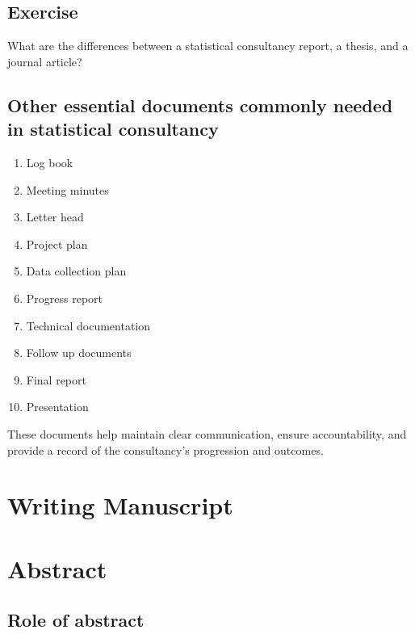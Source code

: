 \documentclass[
  letterpaper,
  DIV=11,
  numbers=noendperiod]{scrreprt}
\begin{document}
\section{Exercise}\label{exercise-3}

What are the differences between a statistical consultancy report, a
thesis, and a journal article?

\section{Other essential documents commonly needed in statistical
consultancy}\label{other-essential-documents-commonly-needed-in-statistical-consultancy}

\begin{enumerate}
\def\labelenumi{\arabic{enumi}.}
\item
  Log book
\item
  Meeting minutes
\item
  Letter head
\item
  Project plan
\item
  Data collection plan
\item
  Progress report
\item
  Technical documentation
\item
  Follow up documents
\item
  Final report
\item
  Presentation
\end{enumerate}

These documents help maintain clear communication, ensure
accountability, and provide a record of the consultancy's progression
and outcomes.


\chapter{Writing Manuscript}\label{writing-manuscript}


\chapter{Abstract}\label{abstract}

\section{Role of abstract}\label{role-of-abstract}
\end{document}
